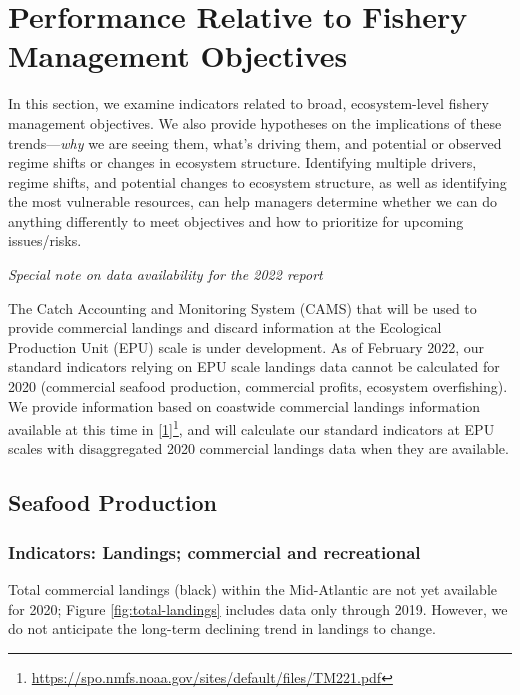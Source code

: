 \documentclass[
  10pt,
]{article}
\begin{document}
\hypertarget{performance-relative-to-fishery-management-objectives}{%
\section{Performance Relative to Fishery Management
Objectives}\label{performance-relative-to-fishery-management-objectives}}

In this section, we examine indicators related to broad, ecosystem-level
fishery management objectives. We also provide hypotheses on the
implications of these trends---\emph{why} we are seeing them, what's
driving them, and potential or observed regime shifts or changes in
ecosystem structure. Identifying multiple drivers, regime shifts, and
potential changes to ecosystem structure, as well as identifying the
most vulnerable resources, can help managers determine whether we can do
anything differently to meet objectives and how to prioritize for
upcoming issues/risks.

\emph{Special note on data availability for the 2022 report}

The Catch Accounting and Monitoring System (CAMS) that will be used to
provide commercial landings and discard information at the Ecological
Production Unit (EPU) scale is under development. As of February 2022,
our standard indicators relying on EPU scale landings data cannot be
calculated for 2020 (commercial seafood production, commercial profits,
ecosystem overfishing). We provide information based on coastwide
commercial landings information available at this time in
{[}\protect\hyperlink{ref-thunberg_northeast_2021}{1}{]}\footnote{\url{https://spo.nmfs.noaa.gov/sites/default/files/TM221.pdf}},
and will calculate our standard indicators at EPU scales with
disaggregated 2020 commercial landings data when they are available.

\hypertarget{seafood-production}{%
\subsection{Seafood Production}\label{seafood-production}}

\hypertarget{indicators-landings-commercial-and-recreational}{%
\subsubsection{Indicators: Landings; commercial and
recreational}\label{indicators-landings-commercial-and-recreational}}

Total commercial landings (black) within the Mid-Atlantic are not yet
available for 2020; Figure \ref{fig:total-landings} includes data only
through 2019. However, we do not anticipate the long-term declining
trend in landings to change.
\end{document}
